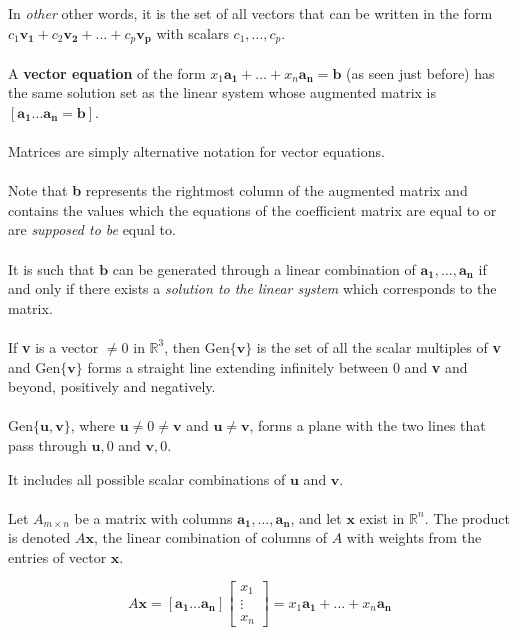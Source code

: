 \documentclass[12pt]{article}
\newcommand{\gen}[1]{\mathrm{Gen}\{{#1}\}}
\newcommand{\R}{\mathbb{R}}
\newcommand{\bt}[1]{\textbf{{#1}}}
\newcommand{\bm}[1]{\mathbf{{#1}}}
\begin{document}
In \emph{other} other words, it is the set of all vectors that can be written in the form $c_1\bm{v_1} +c_2\bm{v_2} + \dots + c_p\bm{v_p}$ with scalars $c_1,\dots,c_p$. \\ \\

A \textbf{vector equation} of the form $x_1\bm{a_1} + \dots + x_n\bm{a_n} = \bm{b}$ (as seen just before) has the same solution set
as the linear system whose augmented matrix is $[\bm{a_1} \dots \bm{a_n} = \bm{b}]$. \\ \\

Matrices are simply alternative notation for vector equations. \\ \\

Note that \bt{b} represents the rightmost column of the augmented matrix and contains the values which the equations of the coefficient
matrix are equal to or are \emph{supposed to be} equal to. \\ \\

It is such that $\bm{b}$ can be generated through a linear combination of $\bm{a_1},\dots,\bm{a_n}$ if and only if
there exists a \emph{solution to the linear system} which corresponds to the matrix. \\ \\

If \bt{v} is a vector $\neq 0$ in $\R^3$, then $\gen{\bm{v}}$ is the set of all the scalar multiples of \bt{v} and $\gen{\bm{v}}$ forms a straight line extending infinitely between $0$ and \bt{v} and beyond, positively and negatively. \\ \\

$\gen{\bm{u, v}}$, where $\bm{u} \neq 0 \neq \bm{v}$ and $\bm{u} \neq \bm{v}$, forms a plane with the two lines that pass through $\bm{u}, 0$ and $\bm{v}, 0$.

It includes all possible scalar combinations of $\bm{u}$ and $\bm{v}$. \\ \\

Let $A_{m\times n}$ be a matrix with columns $\bm{a_1},\dots,\bm{a_n}$, and let $\bm{x}$ exist in $\R^n$. The product is denoted $A\bm{x}$, the linear combination of columns of $A$ with weights from the entries of vector $\bm{x}$.

$$A\bm{x} = [\bm{a_1} \dots \bm{a_n}] \begin{bmatrix} x_1 \\ \vdots \\ x_n \end{bmatrix} = x_1\bm{a_1} + \dots + x_n\bm{a_n}$$
\end{document}
